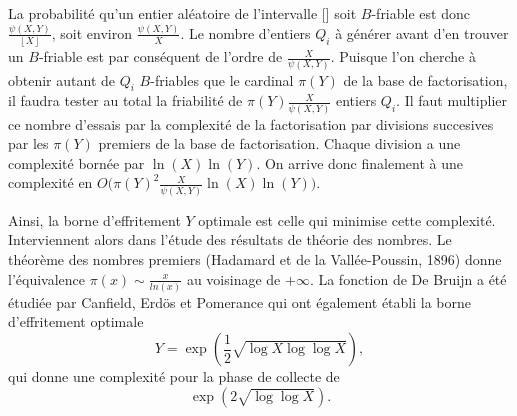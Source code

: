 La probabilité qu'un entier aléatoire de l'intervalle [\![1, X]\!] soit 
$B$-friable est donc $\frac{\psi (X,Y)}{\left\lfloor X \right\rfloor}$, soit
environ $\frac{\psi (X,Y)}{X}$. Le nombre d'entiers $Q_i$ à générer avant d'en 
trouver un $B$-friable est par conséquent de l'ordre de $\frac{X}{\psi(X,Y)}$.
Puisque l'on cherche à obtenir autant de $Q_i$ $B$-friables que le cardinal 
$\pi(Y)$ de la base de factorisation, il faudra tester au total la friabilité
de $\pi(Y)\frac{X}{\psi(X,Y)}$ entiers $Q_i$. Il faut multiplier ce nombre 
d'essais par la complexité de la factorisation par divisions succesives par 
les $\pi(Y)$ premiers de la base de factorisation. Chaque division a une 
complexité bornée par $\ln(X)\ln(Y)$. On arrive donc finalement à une complexité
en $O\big(\pi(Y)^2 \frac{X}{\psi(X,Y)} \ln(X)\ln(Y)\big)$.

Ainsi, la borne d'effritement $Y$ optimale est celle qui minimise cette 
complexité. Interviennent alors dans l'étude des résultats de théorie des 
nombres. Le théorème des nombres premiers (Hadamard et de la
Vallée-Poussin, 1896) donne l'équivalence $\pi(x) \sim \frac{x}{ln(x)}$ au 
voisinage de $+ \infty$. La fonction de De Bruijn a été étudiée par Canfield, 
Erdös et Pomerance qui ont également établi la borne d'effritement optimale  
\[ Y = \exp(\frac{1}{2} \sqrt{\log X \log \log X}),\] qui donne une complexité 
pour la phase de collecte de \[ \exp(2 \sqrt{\log \log X}).\] 


